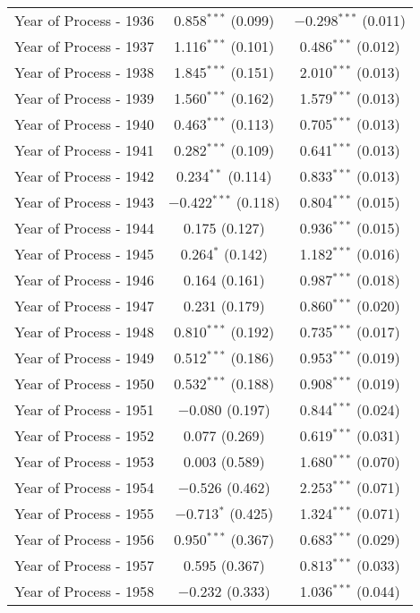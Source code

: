 \begin{table}[!h]
\begin{tabular}{@{\extracolsep{5pt}}lcc}
  Year of Process - 1936 & 0.858$^{***}$ (0.099) & $-$0.298$^{***}$ (0.011) \\ 
  Year of Process - 1937 & 1.116$^{***}$ (0.101) & 0.486$^{***}$ (0.012) \\ 
  Year of Process - 1938 & 1.845$^{***}$ (0.151) & 2.010$^{***}$ (0.013) \\ 
  Year of Process - 1939 & 1.560$^{***}$ (0.162) & 1.579$^{***}$ (0.013) \\ 
  Year of Process - 1940 & 0.463$^{***}$ (0.113) & 0.705$^{***}$ (0.013) \\ 
  Year of Process - 1941 & 0.282$^{***}$ (0.109) & 0.641$^{***}$ (0.013) \\ 
  Year of Process - 1942 & 0.234$^{**}$ (0.114) & 0.833$^{***}$ (0.013) \\ 
  Year of Process - 1943 & $-$0.422$^{***}$ (0.118) & 0.804$^{***}$ (0.015) \\ 
  Year of Process - 1944 & 0.175 (0.127) & 0.936$^{***}$ (0.015) \\ 
  Year of Process - 1945 & 0.264$^{*}$ (0.142) & 1.182$^{***}$ (0.016) \\ 
  Year of Process - 1946 & 0.164 (0.161) & 0.987$^{***}$ (0.018) \\ 
  Year of Process - 1947 & 0.231 (0.179) & 0.860$^{***}$ (0.020) \\ 
  Year of Process - 1948 & 0.810$^{***}$ (0.192) & 0.735$^{***}$ (0.017) \\ 
  Year of Process - 1949 & 0.512$^{***}$ (0.186) & 0.953$^{***}$ (0.019) \\ 
  Year of Process - 1950 & 0.532$^{***}$ (0.188) & 0.908$^{***}$ (0.019) \\ 
  Year of Process - 1951 & $-$0.080 (0.197) & 0.844$^{***}$ (0.024) \\ 
  Year of Process - 1952 & 0.077 (0.269) & 0.619$^{***}$ (0.031) \\ 
  Year of Process - 1953 & 0.003 (0.589) & 1.680$^{***}$ (0.070) \\ 
  Year of Process - 1954 & $-$0.526 (0.462) & 2.253$^{***}$ (0.071) \\ 
  Year of Process - 1955 & $-$0.713$^{*}$ (0.425) & 1.324$^{***}$ (0.071) \\ 
  Year of Process - 1956 & 0.950$^{***}$ (0.367) & 0.683$^{***}$ (0.029) \\ 
  Year of Process - 1957 & 0.595 (0.367) & 0.813$^{***}$ (0.033) \\ 
  Year of Process - 1958 & $-$0.232 (0.333) & 1.036$^{***}$ (0.044) \\ 

\end{tabular}
\end{table}
